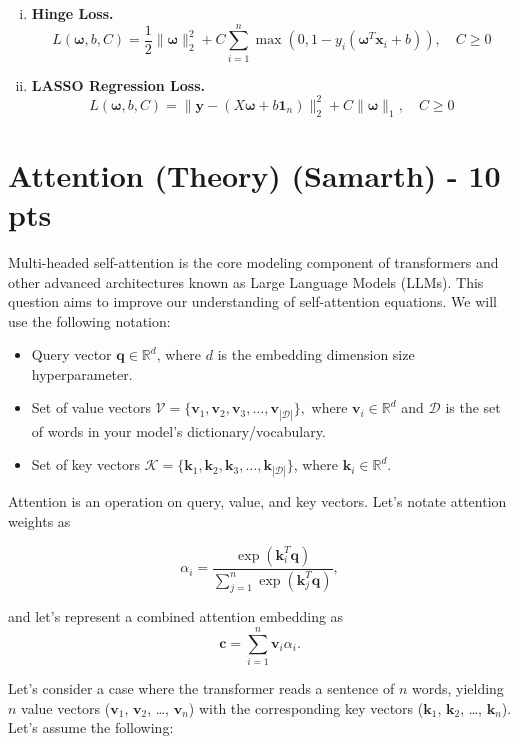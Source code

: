 \documentclass{exam}
\def\v{\mathbf{v}}
\def\k{\mathbf{k}}
\def\q{\mathbf{q}}
\def\c{\mathbf{c}}
\begin{document}
\begin{enumerate}[(a)]
\begin{enumerate}[i.]
        \item  \textbf{Hinge Loss.}
        \begin{equation*}
            L(\bm{\omega}, b, C) = \frac{1}{2} \|\bm{\omega}\|^2_2 + C \sum_{i=1}^n \max(0, 1-y_i(\bm{\omega}^T \bm{x}_i + b)), \quad C\geq0
        \end{equation*}

        \item \textbf{LASSO Regression Loss.}
        \begin{equation*}
            L(\bm{\omega}, b, C) = \|\bm{y} -(X\bm{\omega} + b \bm{1}_n)\|^2_2 + C \|\bm{\omega}\|_1, \quad C\geq 0
        \end{equation*}
    \end{enumerate}
\end{enumerate}



\section{Attention (Theory) (Samarth) - 10 pts}
Multi-headed self-attention is the core modeling component of transformers and other advanced architectures known as Large Language Models (LLMs). This question aims to improve our understanding of self-attention equations. We will use the following notation:

\begin{itemize}
    \item Query vector $\q \in \mathbb{R}^{d}$, where $d$ is the embedding dimension size hyperparameter. 
    \item Set of value vectors $\mathcal{V} =\{ \v_1, \v_2, \v_3, \dots, \v_{|\mathcal{D}|}\},$ where $\v_i \in \mathbb{R}^{d}$ and $\mathcal{D}$ is the set of words in your model's dictionary/vocabulary.
    \item Set of key vectors $\mathcal{K} = \{ \k_1, \k_2, \k_3,\dots, \k_{|\mathcal{D}|}\}$, where $\k_i\in \mathbb{R}^{d}$. 
\end{itemize}

\noindent Attention is an operation on query, value, and key vectors. Let's notate attention weights as

$$\alpha_i = \frac{\exp(\k_i^T \q)}{\sum_{j=1}^{n} \exp(\k_j^T\q)},$$

\noindent and let's represent a combined attention embedding as $$\c = \sum_{i=1}^{n} \v_i \alpha_i.$$
    


Let's consider a case where the transformer reads a sentence of $n$ words, yielding $n$ value vectors ($\v_1$, $\v_2$, \dots, $\v_n$) with the corresponding key vectors ($\k_1$, $\k_2$, \dots, $\k_n$). Let's assume the following:
\end{document}
